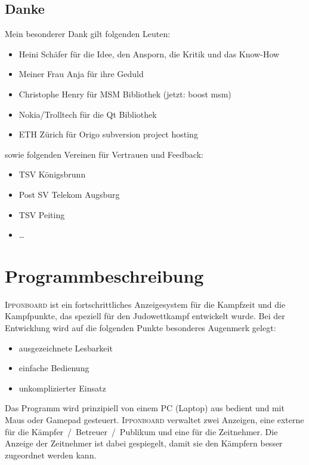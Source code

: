 ﻿\documentclass[11pt,numbers=noenddot]{scrreprt}
\newcommand*{\IB}{\begingroup{\fontspec{Cuprum}\selectfont\textsc{Ipponboard}} \endgroup}
\begin{document}
\newpage
\section{Danke}
Mein besonderer Dank gilt folgenden Leuten:
\begin{itemize}
	\item Heini Schäfer  für die Idee, den Ansporn, die Kritik und das Know-How
	\item Meiner Frau Anja für ihre Geduld
	\item Christophe Henry für MSM Bibliothek (jetzt: boost msm)
	\item Nokia/Trolltech für die Qt Bibliothek
	\item ETH Zürich für Origo subversion project hosting
\end{itemize}

sowie folgenden Vereinen für Vertrauen und Feedback:
\begin{itemize}
	\item TSV Königsbrunn
	\item Post SV Telekom Augsburg
	\item TSV Peiting
	\item \dots
\end{itemize}



\chapter{Programmbeschreibung}
{\IB} ist ein fortschrittliches Anzeigesystem für die Kampfzeit und die Kampfpunkte, das speziell für den Judowettkampf entwickelt wurde. Bei der Entwicklung wird auf die folgenden Punkte besonderes Augenmerk gelegt:
\begin{itemize}
	\item ausgezeichnete Lesbarkeit
	\item einfache Bedienung
	\item unkomplizierter Einsatz
\end{itemize}

Das Programm wird prinzipiell von einem PC (Laptop) aus bedient und mit Maus oder Gamepad gesteuert. {\IB} verwaltet zwei Anzeigen, eine externe für die Kämpfer~/~Betreuer~/~Publikum und eine für die Zeitnehmer. Die Anzeige der Zeitnehmer ist dabei gespiegelt, damit sie den Kämpfern besser zugeordnet werden kann.
\end{document}
